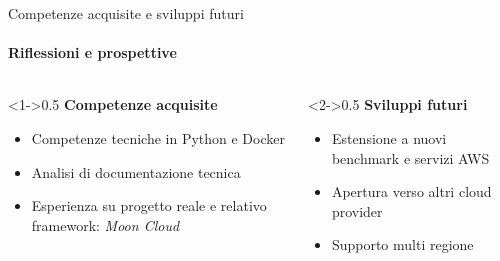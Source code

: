 \documentclass{beamer}
\begin{document}
\begin{frame}{Competenze acquisite e sviluppi futuri}
    \framesubtitle{Riflessioni e prospettive}
    \begin{columns}
        \begin{column}<1->{0.5\textwidth}
            \textbf{Competenze acquisite}
            \begin{itemize}
                \item Competenze tecniche in Python e Docker
                \item Analisi di documentazione tecnica
                \item Esperienza su progetto reale e relativo framework: \emph{Moon Cloud}
            \end{itemize}
        \end{column}
        \begin{column}<2->{0.5\textwidth}
            \textbf{Sviluppi futuri}
            \begin{itemize}
                \item Estensione a nuovi benchmark e servizi AWS
                \item Apertura verso altri cloud provider
                \item Supporto multi regione
            \end{itemize}
        \end{column}
    \end{columns}
\end{frame}




\backmatter
\end{document}

